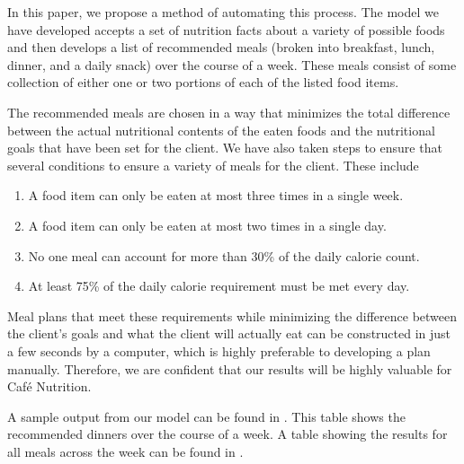 \documentclass[twoside]{article}
\newcommand{\cn}{Caf\'e Nutrition\xspace}
\begin{document}
In this paper, we propose a method of automating this process. The model we have developed accepts a set of nutrition facts about a variety of possible foods and then develops a list of recommended meals (broken into breakfast, lunch, dinner, and a daily snack) over the course of a week. These meals consist of some collection of either one or two portions of each of the listed food items.

The recommended meals are chosen in a way that minimizes the total difference between the actual nutritional contents of the eaten foods and the nutritional goals that have been set for the client. We have also taken steps to ensure that several conditions to ensure a variety of meals for the client. These include
\begin{enumerate}
    \item A food item can only be eaten at most three times in a single week.
    \item A food item can only be eaten at most two times in a single day.
    \item No one meal can account for more than 30\% of the daily calorie count.
    \item At least 75\% of the daily calorie requirement must be met every day.
\end{enumerate}

Meal plans that meet these requirements while minimizing the difference between the client's goals and what the client will actually eat can be constructed in just a few seconds by a computer, which is highly preferable to developing a plan manually. Therefore, we are confident that our results will be highly valuable for \cn.

A sample output from our model can be found in . This table shows the recommended dinners over the course of a week. A table showing the results for all meals across the week can be found in .
\end{document}
